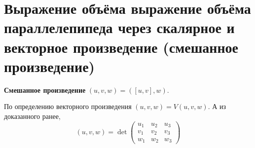 \section{Выражение объёма выражение объёма параллелепипеда через скалярное и векторное произведение (смешанное произведение)}
\begin{definition}
    \textbf{Смешанное произведение} $(u, v, w) = ([u, v], w)$.
\end{definition}

\begin{orangebox}
    По определению векторного произведения $(u, v, w) = V(u, v, w)$. А из доказанного ранее, 
    $$
    (u, v, w) = \det\begin{pmatrix}
        u_1 & u_2 & u_3\\
        v_1 & v_2 & v_3\\
        w_1 & w_2 & w_3
    \end{pmatrix}
    $$
\end{orangebox}


